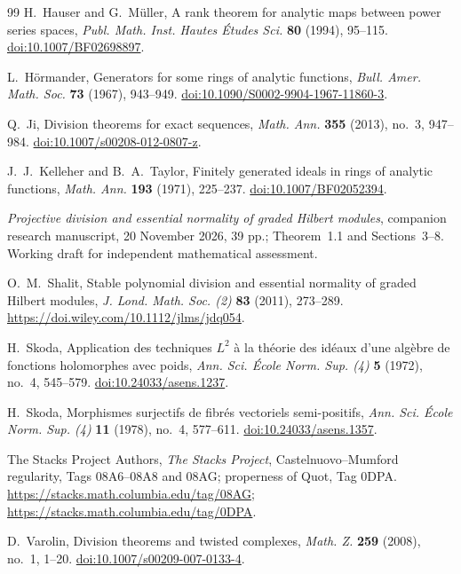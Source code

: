 \documentclass[11pt,reqno]{amsart}
\theoremstyle{remark}
\begin{document}
\begin{thebibliography}{99}
H.~Hauser and G.~M\"uller, A rank theorem for analytic maps between
power series spaces, \emph{Publ. Math. Inst. Hautes \'Etudes Sci.}
\textbf{80} (1994), 95--115.
\href{https://doi.org/10.1007/BF02698897}{doi:10.1007/BF02698897}.


L.~H\"ormander, Generators for some rings of analytic functions,
\emph{Bull. Amer. Math. Soc.} \textbf{73} (1967), 943--949.
\href{https://doi.org/10.1090/S0002-9904-1967-11860-3}{doi:10.1090/S0002-9904-1967-11860-3}.

Q.~Ji, Division theorems for exact sequences,
\emph{Math. Ann.} \textbf{355} (2013), no.~3, 947--984.
\href{https://doi.org/10.1007/s00208-012-0807-z}{doi:10.1007/s00208-012-0807-z}.

J.~J.~Kelleher and B.~A.~Taylor, Finitely generated ideals in rings
of analytic functions, \emph{Math. Ann.} \textbf{193} (1971),
225--237.
\href{https://doi.org/10.1007/BF02052394}{doi:10.1007/BF02052394}.

\emph{Projective division and essential normality of graded Hilbert modules},
companion research manuscript, 20 November 2026, 39 pp.;
Theorem~1.1 and Sections~3--8. Working draft for independent
mathematical assessment.

O.~M.~Shalit, Stable polynomial division and essential normality of
graded Hilbert modules, \emph{J. Lond. Math. Soc. (2)}
\textbf{83} (2011), 273--289.
\url{https://doi.wiley.com/10.1112/jlms/jdq054}.


H.~Skoda, Application des techniques $L^2$ \`a la th\'eorie des
id\'eaux d'une alg\`ebre de fonctions holomorphes avec poids,
\emph{Ann. Sci. \'Ecole Norm. Sup. (4)} \textbf{5} (1972), no.~4,
545--579.
\href{https://doi.org/10.24033/asens.1237}{doi:10.24033/asens.1237}.

H.~Skoda, Morphismes surjectifs de fibr\'es vectoriels semi-positifs,
\emph{Ann. Sci. \'Ecole Norm. Sup. (4)} \textbf{11} (1978), no.~4,
577--611.
\href{https://doi.org/10.24033/asens.1357}{doi:10.24033/asens.1357}.

The Stacks Project Authors, \emph{The Stacks Project},
Castelnuovo--Mumford regularity, Tags 08A6--08A8 and 08AG;
properness of Quot, Tag 0DPA.
\url{https://stacks.math.columbia.edu/tag/08AG};
\url{https://stacks.math.columbia.edu/tag/0DPA}.

D.~Varolin, Division theorems and twisted complexes,
\emph{Math. Z.} \textbf{259} (2008), no.~1, 1--20.
\href{https://doi.org/10.1007/s00209-007-0133-4}{doi:10.1007/s00209-007-0133-4}.

\end{thebibliography}
\end{document}
